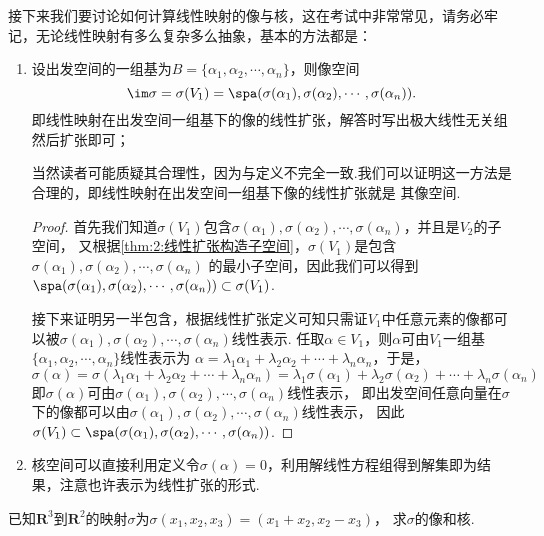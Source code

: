 接下来我们要讨论如何计算线性映射的像与核，这在考试中非常常见，请务必牢记，无论线性映射有多么复杂多么抽象，基本的方法都是：
\begin{enumerate}
    \item 设出发空间的一组基为$B=\{\alpha_1,\alpha_2,\cdots,\alpha_n\}$，则像空间
    \[\im \sigma=\sigma(V_1)=\spa(\sigma(\alpha_1),\sigma(\alpha_2),\cdots,\sigma(\alpha_n)).\]
    即线性映射在出发空间一组基下的像的线性扩张，解答时写出极大线性无关组然后扩张即可；

    当然读者可能质疑其合理性，因为与定义不完全一致.我们可以证明这一方法是合理的，即线性映射在出发空间一组基下像的线性扩张就是
    其像空间.
    
    \begin{proof}
        首先我们知道$\sigma(V_1)$包含$\sigma(\alpha_1),\sigma(\alpha_2),\cdots,\sigma(\alpha_n)$，并且是$V_2$的子空间，
        又根据\autoref{thm:2:线性扩张构造子空间}，$\sigma(V_1)$是包含$\sigma(\alpha_1),\sigma(\alpha_2),\cdots,\sigma(\alpha_n)$
        的最小子空间，因此我们可以得到$\spa(\sigma(\alpha_1),\sigma(\alpha_2),\cdots,\sigma(\alpha_n))\subset\sigma(V_1)$.

        接下来证明另一半包含，根据线性扩张定义可知只需证$V_1$中任意元素的像都可以被$\sigma(\alpha_1),\sigma(\alpha_2),\cdots,\sigma(\alpha_n)$线性表示.
        任取$\alpha\in V_1$，则$\alpha$可由$V_1$一组基$\{\alpha_1,\alpha_2,\cdots,\alpha_n\}$线性表示为
        $\alpha=\lambda_1\alpha_1+\lambda_2\alpha_2+\cdots+\lambda_n\alpha_n$，于是，
        \[\sigma(\alpha)=\sigma(\lambda_1\alpha_1+\lambda_2\alpha_2+\cdots+\lambda_n\alpha_n)=\lambda_1\sigma(\alpha_1)+\lambda_2\sigma(\alpha_2)+\cdots+\lambda_n\sigma(\alpha_n)\]
        即$\sigma(\alpha)$可由$\sigma(\alpha_1),\sigma(\alpha_2),\cdots,\sigma(\alpha_n)$线性表示，
        即出发空间任意向量在$\sigma$下的像都可以由$\sigma(\alpha_1),\sigma(\alpha_2),\cdots,\sigma(\alpha_n)$线性表示，
        因此$\sigma(V_1)\subset\spa(\sigma(\alpha_1),\sigma(\alpha_2),\cdots,\sigma(\alpha_n))$.
    \end{proof}

    \item 核空间可以直接利用定义令$\sigma(\alpha)=0$，利用解线性方程组得到解集即为结果，注意也许表示为线性扩张的形式.
\end{enumerate}
\begin{example}
    已知$\mathbf{R}^3$到$\mathbf{R}^2$的映射$\sigma$为$\sigma(x_1,x_2,x_3)=(x_1+x_2,x_2-x_3)$，
    求$\sigma$的像和核.
\end{example}
